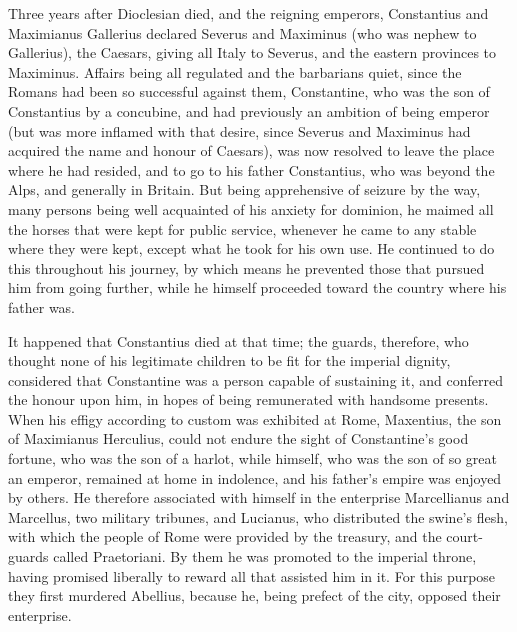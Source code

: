 Three years after Dioclesian died, and the reigning emperors, Constantius and Maximianus Gallerius declared Severus and Maximinus (who was nephew to Gallerius), the Caesars, giving all Italy to Severus, and the eastern provinces to Maximinus. Affairs being all regulated and the barbarians quiet, since the Romans had been so successful against them, Constantine, who was the son of Constantius by a concubine, and had previously an ambition of being emperor (but was more inflamed with that desire, since Severus and Maximinus had acquired the name and honour of Caesars), was now resolved to leave the place where he had resided, and to go to his father
Constantius, who was beyond the Alps, and generally in Britain. But being apprehensive of seizure by the way, many persons being well acquainted of his anxiety for dominion, he maimed all the horses that were kept for public service, whenever he came to any stable where they were kept, except what he took for his own use. He continued to do this throughout his journey, by which means he prevented those that pursued him from going further, while he himself proceeded toward the country where his father was.

It happened that Constantius died at that time; the guards, therefore, who thought none of his legitimate children to be fit for the imperial dignity, considered that Constantine was a person capable of sustaining it, and conferred the honour upon him, in hopes of being remunerated with handsome presents. When his effigy according to custom was exhibited at Rome, Maxentius, the son of Maximianus Herculius, could not endure the sight of Constantine's good fortune, who was the son of a harlot, while himself, who was the son of so great an emperor, remained at home in indolence, and his father's empire was enjoyed by others. He therefore associated with himself in the enterprise Marcellianus and Marcellus, two military tribunes, and Lucianus, who distributed the swine's flesh, with which the people of Rome were provided by the treasury, and the court-guards called Praetoriani. By them he was promoted to the imperial throne, having promised liberally to reward all that assisted him in it. For this purpose they first murdered Abellius, because he, being prefect of the city, opposed their enterprise.

